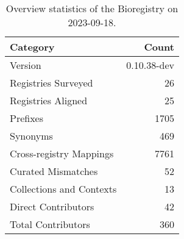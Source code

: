 \begin{table}
\caption{Overview statistics of the Bioregistry on 2023-09-18.}
\label{tab:bioregistry-summary}
\begin{tabular}{lr}
\toprule
Category & Count \\
\midrule
Version & 0.10.38-dev \\
Registries Surveyed & 26 \\
Registries Aligned & 25 \\
Prefixes & 1705 \\
Synonyms & 469 \\
Cross-registry Mappings & 7761 \\
Curated Mismatches & 52 \\
Collections and Contexts & 13 \\
Direct Contributors & 42 \\
Total Contributors & 360 \\
\bottomrule
\end{tabular}
\end{table}
